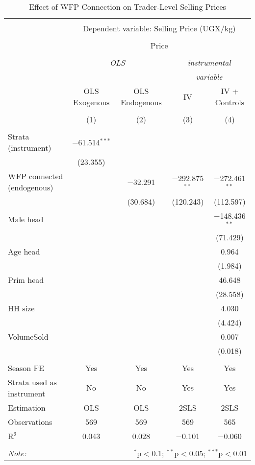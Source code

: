 
\begin{table}[!htbp] \centering 
  \caption{Effect of WFP Connection on Trader-Level Selling Prices} 
  \label{tab:wfp_trader_prices} 
\begin{tabular}{@{\extracolsep{5pt}}lcccc} 
\\[-1.8ex]\hline 
\hline \\[-1.8ex] 
 & \multicolumn{4}{c}{Dependent variable: Selling Price (UGX/kg)} \\ 
\cline{2-5} 
\\[-1.8ex] & \multicolumn{4}{c}{Price} \\ 
\\[-1.8ex] & \multicolumn{2}{c}{\textit{OLS}} & \multicolumn{2}{c}{\textit{instrumental}} \\ 
 & \multicolumn{2}{c}{\textit{}} & \multicolumn{2}{c}{\textit{variable}} \\ 
 & OLS Exogenous & OLS Endogenous & IV & IV + Controls \\ 
\\[-1.8ex] & (1) & (2) & (3) & (4)\\ 
\hline \\[-1.8ex] 
 Strata (instrument) & $-$61.514$^{***}$ &  &  &  \\ 
  & (23.355) &  &  &  \\ 
  WFP connected (endogenous) &  & $-$32.291 & $-$292.875$^{**}$ & $-$272.461$^{**}$ \\ 
  &  & (30.684) & (120.243) & (112.597) \\ 
  Male head &  &  &  & $-$148.436$^{**}$ \\ 
  &  &  &  & (71.429) \\ 
  Age head &  &  &  & 0.964 \\ 
  &  &  &  & (1.984) \\ 
  Prim head &  &  &  & 46.648 \\ 
  &  &  &  & (28.558) \\ 
  HH size &  &  &  & 4.030 \\ 
  &  &  &  & (4.424) \\ 
  VolumeSold &  &  &  & 0.007 \\ 
  &  &  &  & (0.018) \\ 
 \hline \\[-1.8ex] 
Season FE & Yes & Yes & Yes & Yes \\ 
Strata used as instrument & No & No & Yes & Yes \\ 
Estimation & OLS & OLS & 2SLS & 2SLS \\ 
Observations & 569 & 569 & 569 & 565 \\ 
R$^{2}$ & 0.043 & 0.028 & $-$0.101 & $-$0.060 \\ 
\hline 
\hline \\[-1.8ex] 
\textit{Note:}  & \multicolumn{4}{r}{$^{*}$p$<$0.1; $^{**}$p$<$0.05; $^{***}$p$<$0.01} \\ 
\end{tabular} 
\end{table} 
